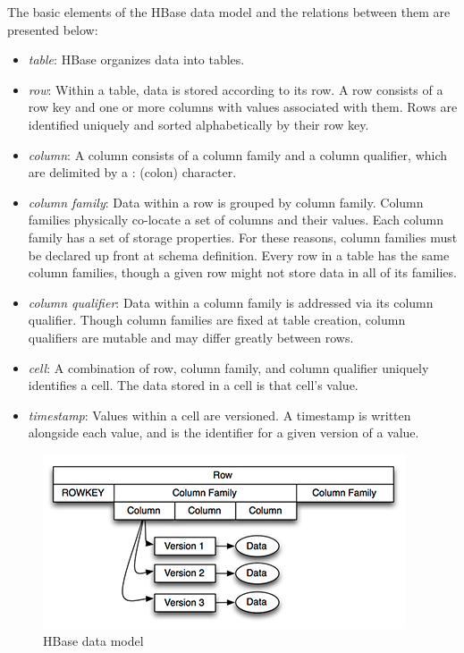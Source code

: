 The basic elements of the HBase data model and the relations between them are presented below:
\begin{itemize}
\item \emph{table}: HBase organizes data into tables.
\item \emph{row}: Within a table, data is stored according to its row. A row consists of a row key and one or more columns with values associated with them. Rows are identified uniquely and sorted alphabetically by their row key.
\item \emph{column}: A column consists of a column family and a column qualifier, which are delimited by a : (colon) character.
\item \emph{column family}: Data within a row is grouped by column family. Column families physically co-locate a set of columns and their values. Each column family has a set of storage properties. For these reasons, column families must be declared up front at schema definition. Every row in a table has the same column families, though a given row might not store data in all of its families.
\item \emph{column qualifier}: Data within a column family is addressed via its column qualifier. Though column families are fixed at table creation, column qualifiers are mutable and may differ greatly between rows.
\item \emph{cell}: A combination of row, column family, and column qualifier uniquely identifies a cell. The data stored in a cell is that cell's value.
\item \emph{timestamp}: Values within a cell are versioned. A timestamp is written alongside each value, and is the identifier for a given version of a value.
\end{itemize}

\begin{figure}[H]
\centering
\includegraphics{figures/hbase_data_model}
\caption{HBase data model}
\label{figure:hbase_data_model}
\end{figure}

